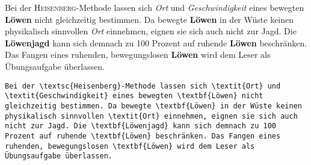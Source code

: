 \begin{frame}[fragile]
	\Losung
	\begin{outputbox}
			Bei der \textsc{Heisenberg}-Methode lassen sich \textit{Ort} und \textit{Geschwindigkeit} eines bewegten \textbf{Löwen} nicht gleichzeitig bestimmen. Da bewegte \textbf{Löwen} in der Wüste keinen physikalisch sinnvollen \textit{Ort} einnehmen, eignen sie sich auch nicht zur Jagd. Die \textbf{Löwenjagd} kann sich demnach zu 100 Prozent auf ruhende \textbf{Löwen} beschränken. Das Fangen eines ruhenden, bewegungslosen \textbf{Löwen} wird dem Leser als Übungsaufgabe überlassen.
	\end{outputbox}

	\Code
	\begin{lstlisting}[gobble=8]
		Bei der \textsc{Heisenberg}-Methode lassen sich \textit{Ort} und \textit{Geschwindigkeit} eines bewegten \textbf{Löwen} nicht gleichzeitig bestimmen. Da bewegte \textbf{Löwen} in der Wüste keinen physikalisch sinnvollen \textit{Ort} einnehmen, eignen sie sich auch nicht zur Jagd. Die \textbf{Löwenjagd} kann sich demnach zu 100 Prozent auf ruhende \textbf{Löwen} beschränken. Das Fangen eines ruhenden, bewegungslosen \textbf{Löwen} wird dem Leser als Übungsaufgabe überlassen.
	\end{lstlisting}
\end{frame}
